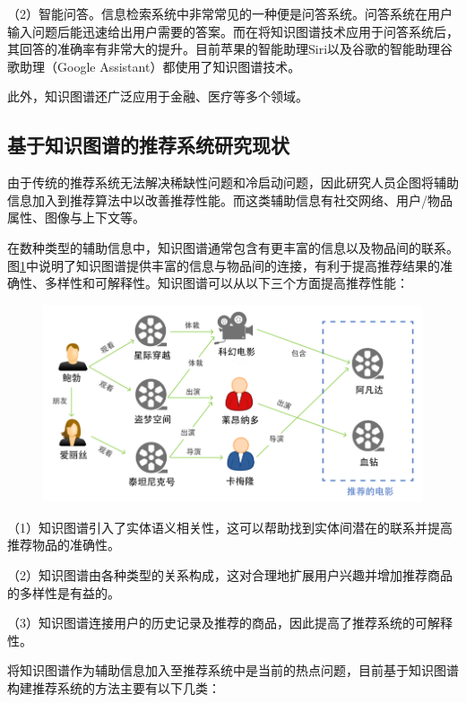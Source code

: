 \documentclass{bjfuthesis}
\begin{document}
（2）智能问答。信息检索系统中非常常见的一种便是问答系统。问答系统在用户输入问题后能迅速给出用户需要的答案。而在将知识图谱技术应用于问答系统后，其回答的准确率有非常大的提升。目前苹果的智能助理Siri以及谷歌的智能助理谷歌助理（Google Assistant）都使用了知识图谱技术。

此外，知识图谱还广泛应用于金融、医疗等多个领域。
\subsection{基于知识图谱的推荐系统研究现状}
由于传统的推荐系统无法解决稀缺性问题和冷启动问题，因此研究人员企图将辅助信息加入到推荐算法中以改善推荐性能。而这类辅助信息有社交网络、用户/物品属性、图像与上下文等。

在数种类型的辅助信息中，知识图谱通常包含有更丰富的信息以及物品间的联系。图\ref{fig:enhanced-recommendation}中说明了知识图谱提供丰富的信息与物品间的连接，有利于提高推荐结果的准确性、多样性和可解释性。知识图谱可以从以下三个方面提高推荐性能：
\begin{figure}
	\includegraphics[width=\textwidth]{figures/enhanced-recommendation.png}
	\label{fig:enhanced-recommendation}
\end{figure}

（1）知识图谱引入了实体语义相关性，这可以帮助找到实体间潜在的联系并提高推荐物品的准确性。

（2）知识图谱由各种类型的关系构成，这对合理地扩展用户兴趣并增加推荐商品的多样性是有益的。

（3）知识图谱连接用户的历史记录及推荐的商品，因此提高了推荐系统的可解释性。

将知识图谱作为辅助信息加入至推荐系统中是当前的热点问题，目前基于知识图谱构建推荐系统的方法主要有以下几类：
\end{document}
